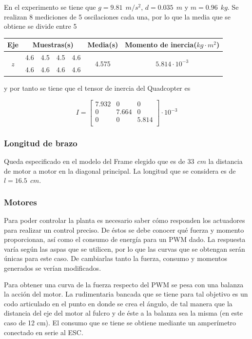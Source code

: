 \documentclass[twoside,11pt]{report}
\begin{document}
En el experimento se tiene que $g=9.81\>\>m/s^{2}$, $d=0.035\>\>m$ y $m=0.96\>\>kg$. Se realizan 8 mediciones de 5 oscilaciones cada una, por lo que la media que se obtiene se divide entre 5

\begin{center}
\begin{tabular}{|c|cccc|c|c|}
\hline
\textbf{Eje} & \multicolumn{4}{c|}{\textbf{Muestras}(s)} & \textbf{Media}(s) & \textbf{Momento de inercia}($kg \cdot m^{2}$) \\
\hline
\multirow{2}{*}{$z$} & 4.6 & 4.5 & 4.5 & 4.6 & \multirow{2}{*}{4.575} & \multirow{2}{*}{$5.814 \cdot 10^{-3}$} \\
& 4.6 & 4.6 & 4.6 & 4.6 & & \\
\hline
\end{tabular}
\end{center}
y por tanto se tiene que el tensor de inercia del Quadcopter es

\begin{equation}
I=\left[ \begin{array}{ccc}
7.932 & 0 & 0 \\
0 & 7.664 & 0 \\
0 & 0 & 5.814 \\
\end{array} \right] \cdot 10^{-3}
\end{equation}

\subsubsection*{Longitud de brazo}

Queda especificado en el modelo del Frame elegido que es de $33 \>\> cm$ la distancia de motor a motor en la diagonal principal. La longitud que se considera  es de $l=16.5 \>\> cm$.

\subsubsection*{Motores}
Para poder controlar la planta es necesario saber cómo responden los actuadores para realizar un control preciso. De éstos se debe conocer qué fuerza y momento proporcionan, así como el consumo de energía para un PWM dado. La respuesta varía según las aspas que se utilicen, por lo que las curvas que se obtengan serán únicas para este caso. De cambiarlas tanto la fuerza, consumo y momentos generados se verían modificados.  


Para obtener una curva de la fuerza respecto del PWM se pesa con una balanza la acción del motor. La rudimentaria bancada que se tiene para tal objetivo es un codo articulado en el punto en donde se crea el ángulo, de tal manera que la distancia del eje del motor al fulcro y de éste a la balanza sea la misma (en este caso de 12 cm). El consumo que se tiene se obtiene mediante un amperímetro conectado en serie al ESC.
\end{document}
